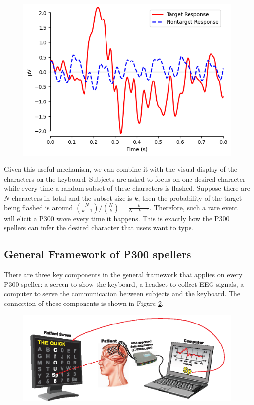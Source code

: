 \documentclass{article}
\begin{document}
\vspace{-3mm}
\begin{figure}[H]
	\centering
	\includegraphics[width=0.5\linewidth]{waves.png}
	\vspace*{-1.5mm}
	\label{fig:1}
\end{figure}

\vspace{-3mm}
Given this useful mechanism, we can combine it with the visual display of the characters on the keyboard. Subjects are asked to focus on one desired character while every time a random subset of these characters is flashed. Suppose there are $N$ characters in total and the subset size is $k$, then the probability of the target being flashed is around ${N \choose k-1} / {N \choose k} = \frac{k}{N-k+1}$. Therefore, such a rare event will elicit a P300 wave every time it happens. This is exactly how the P300 spellers can infer the desired character that users want to type.

\subsection{General Framework of P300 spellers} \label{Framework}
There are three key components in the general framework that applies on every P300 speller: a screen to show the keyboard, a headset to collect EEG signals, a computer to serve the communication between subjects and the keyboard. The connection of these components is shown in Figure \ref{fig:2}.

\vspace{-3mm}
\begin{figure}[H]
	\centering
	\includegraphics[width=0.7\linewidth]{overview.png}
	\label{fig:2}
\end{figure}
\end{document}
